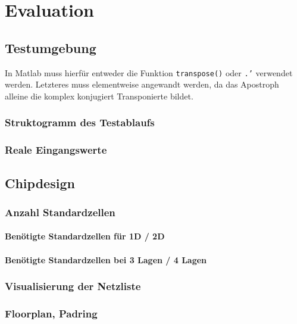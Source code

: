 
 






  
 \chapter{Evaluation}
 


 \section{Testumgebung}

In Matlab muss hierfür entweder die Funktion \texttt{transpose()} oder \texttt{.'} verwendet werden. Letzteres muss elementweise angewandt werden, da das Apostroph
alleine die komplex konjugiert Transponierte bildet.

 
 \subsection{Struktogramm des Testablaufs}
 \subsection{Reale Eingangswerte}
 
 \section{Chipdesign}
 \subsection{Anzahl Standardzellen}
 \subsubsection{Benötigte Standardzellen für 1D / 2D}
 \subsubsection{Benötigte Standardzellen bei 3 Lagen / 4 Lagen}
 \subsection{Visualisierung der Netzliste}
 \subsection{Floorplan, Padring}
 
